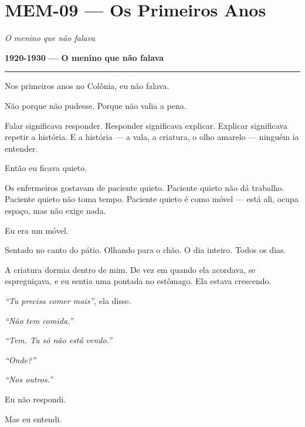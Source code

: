 \section*{\textbf{MEM-09} --- Os Primeiros Anos}

\noindent \textit{O menino que não falava}

\noindent \textbf{1920-1930 --- O menino que não falava}

\vspace{0.5em}\noindent\rule{\textwidth}{0.5pt}\vspace{0.5em}

\noindent Nos primeiros anos no Colônia, eu não falava.

\noindent Não porque não pudesse. Porque não valia a pena.

\noindent Falar significava responder. Responder significava explicar. Explicar significava repetir a história. E a história --- a vala, a criatura, o olho amarelo --- ninguém ia entender.

\noindent Então eu ficava quieto.

\noindent Os enfermeiros gostavam de paciente quieto. Paciente quieto não dá trabalho. Paciente quieto não toma tempo. Paciente quieto é como móvel --- está ali, ocupa espaço, mas não exige nada.

\noindent Eu era um móvel.

\noindent Sentado no canto do pátio. Olhando para o chão. O dia inteiro. Todos os dias.

\noindent A criatura dormia dentro de mim. De vez em quando ela acordava, se espreguiçava, e eu sentia uma pontada no estômago. Ela estava crescendo.

\noindent \textit{\textquotedblleft{}Tu precisa comer mais\textquotedblright{}}, ela disse.

\noindent \textit{\textquotedblleft{}Não tem comida.\textquotedblright{}}

\noindent \textit{\textquotedblleft{}Tem. Tu só não está vendo.\textquotedblright{}}

\noindent \textit{\textquotedblleft{}Onde?\textquotedblright{}}

\noindent \textit{\textquotedblleft{}Nos outros.\textquotedblright{}}

\noindent Eu não respondi.

\noindent Mas eu entendi.

